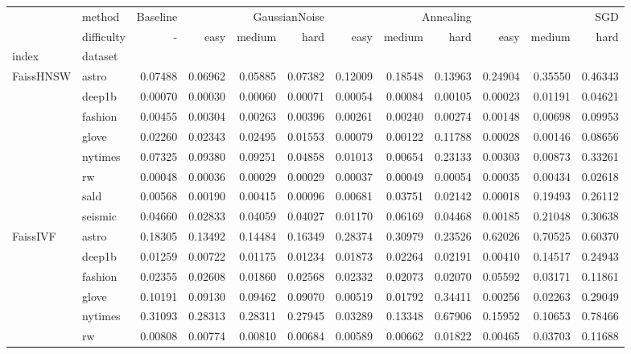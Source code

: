 \begin{tabular}{ll|r|rrr|rrr|rrr}
\toprule
 & method & Baseline & \multicolumn{3}{r}{GaussianNoise} & \multicolumn{3}{r}{Annealing} & \multicolumn{3}{r}{SGD} \\
 & difficulty & - & easy & medium & hard & easy & medium & hard & easy & medium & hard \\
index & dataset &  &  &  &  &  &  &  &  &  &  \\
\midrule
\multirow[t]{8}{*}{FaissHNSW} & astro & 0.07488 & 0.06962 & 0.05885 & 0.07382 & 0.12009 & 0.18548 & 0.13963 & 0.24904 & 0.35550 & 0.46343 \\
 & deep1b & 0.00070 & 0.00030 & 0.00060 & 0.00071 & 0.00054 & 0.00084 & 0.00105 & 0.00023 & 0.01191 & 0.04621 \\
 & fashion & 0.00455 & 0.00304 & 0.00263 & 0.00396 & 0.00261 & 0.00240 & 0.00274 & 0.00148 & 0.00698 & 0.09953 \\
 & glove & 0.02260 & 0.02343 & 0.02495 & 0.01553 & 0.00079 & 0.00122 & 0.11788 & 0.00028 & 0.00146 & 0.08656 \\
 & nytimes & 0.07325 & 0.09380 & 0.09251 & 0.04858 & 0.01013 & 0.00654 & 0.23133 & 0.00303 & 0.00873 & 0.33261 \\
 & rw & 0.00048 & 0.00036 & 0.00029 & 0.00029 & 0.00037 & 0.00049 & 0.00054 & 0.00035 & 0.00434 & 0.02618 \\
 & sald & 0.00568 & 0.00190 & 0.00415 & 0.00096 & 0.00681 & 0.03751 & 0.02142 & 0.00018 & 0.19493 & 0.26112 \\
 & seismic & 0.04660 & 0.02833 & 0.04059 & 0.04027 & 0.01170 & 0.06169 & 0.04468 & 0.00185 & 0.21048 & 0.30638 \\
\cline{1-12}
\multirow[t]{8}{*}{FaissIVF} & astro & 0.18305 & 0.13492 & 0.14484 & 0.16349 & 0.28374 & 0.30979 & 0.23526 & 0.62026 & 0.70525 & 0.60370 \\
 & deep1b & 0.01259 & 0.00722 & 0.01175 & 0.01234 & 0.01873 & 0.02264 & 0.02191 & 0.00410 & 0.14517 & 0.24943 \\
 & fashion & 0.02355 & 0.02608 & 0.01860 & 0.02568 & 0.02332 & 0.02073 & 0.02070 & 0.05592 & 0.03171 & 0.11861 \\
 & glove & 0.10191 & 0.09130 & 0.09462 & 0.09070 & 0.00519 & 0.01792 & 0.34411 & 0.00256 & 0.02263 & 0.29049 \\
 & nytimes & 0.31093 & 0.28313 & 0.28311 & 0.27945 & 0.03289 & 0.13348 & 0.67906 & 0.15952 & 0.10653 & 0.78466 \\
 & rw & 0.00808 & 0.00774 & 0.00810 & 0.00684 & 0.00589 & 0.00662 & 0.01822 & 0.00465 & 0.03703 & 0.11688 \\

\end{tabular}
